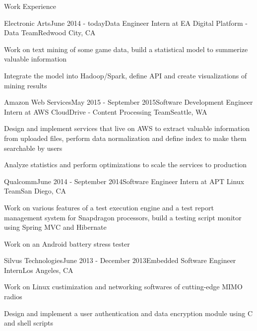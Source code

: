 \documentclass{resume} %
\begin{document}
\begin{rSection}{Work Experience}

\begin{rSubsection}{Electronic Arts}{June 2014 - today}{Data Engineer Intern at EA Digital Platform - Data Team}{Redwood City, CA}
\item Work on text mining of some game data, build a statistical model to summerize valuable information
\item Integrate the model into Hadoop/Spark, define API and create visualizations of mining results
\end{rSubsection}



\begin{rSubsection}{Amazon Web Services}{May 2015 - September 2015}{Software Development Engineer Intern at AWS CloudDrive - Content Processing Team}{Seattle, WA}
\item Design and implement services that live on AWS to extract valuable information from uploaded files, perform data normalization and define index to make them searchable by users
\item Analyze statistics and perform optimizations to scale the services to production
\end{rSubsection}


\begin{rSubsection}{Qualcomm}{June 2014 - September 2014}{Software Engineer Intern at APT Linux Team}{San Diego, CA}
\item Work on various features of a test execution engine and a test report management system for Snapdragon processors, build a testing script monitor using Spring MVC and Hibernate
\item Work on an Android battery stress tester
\end{rSubsection}


\begin{rSubsection}{Silvus Technologies}{June 2013 - December 2013}{Embedded Software Engineer Intern}{Los Angeles, CA}
\item Work on Linux custimization and networking softwares of cutting-edge MIMO radios
\item Design and implement a user authentication and data encryption module using C and shell scripts
\end{rSubsection}

\end{rSection}
\end{document}

